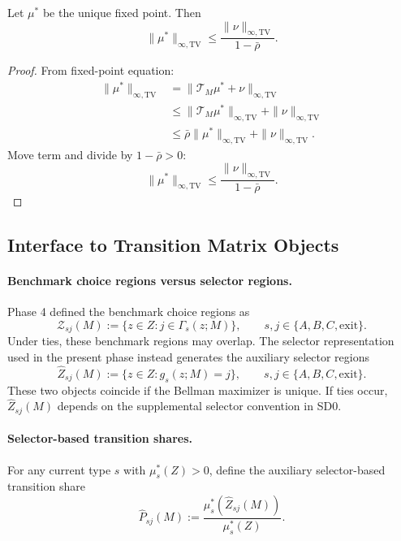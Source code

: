 \begin{proposition}
Let $\mu^*$ be the unique fixed point. Then
\begin{equation}
\|\mu^*\|_{\infty,\mathrm{TV}}
\le\frac{\|\nu\|_{\infty,\mathrm{TV}}}{1-\bar\rho}.
\label{eq:p7_mass_bound}
\end{equation}
\end{proposition}

\begin{proof}
From fixed-point equation:
\begin{align*}
\|\mu^*\|_{\infty,\mathrm{TV}}
&=\|\mathcal T_M\mu^*+\nu\|_{\infty,\mathrm{TV}}\\
&\le\|\mathcal T_M\mu^*\|_{\infty,\mathrm{TV}}+\|\nu\|_{\infty,\mathrm{TV}}\\
&\le\bar\rho\|\mu^*\|_{\infty,\mathrm{TV}}+\|\nu\|_{\infty,\mathrm{TV}}.
\end{align*}
Move term and divide by $1-\bar\rho>0$:
\[
\|\mu^*\|_{\infty,\mathrm{TV}}
\le\frac{\|\nu\|_{\infty,\mathrm{TV}}}{1-\bar\rho}.
\]
\end{proof}

\subsection{Interface to Transition Matrix Objects}

\paragraph{Benchmark choice regions versus selector regions.}
Phase 4 defined the benchmark choice regions as
\[
\mathcal Z_{sj}(M):=\{z\in Z:j\in\Gamma_s(z;M)\},
\qquad s,j\in\{A,B,C,\mathrm{exit}\}.
\]
Under ties, these benchmark regions may overlap. The selector representation used in the present phase instead generates the auxiliary selector regions
\[
\widehat Z_{sj}(M):=\{z\in Z:g_s(z;M)=j\},
\qquad s,j\in\{A,B,C,\mathrm{exit}\}.
\]
These two objects coincide if the Bellman maximizer is unique. If ties occur, $\widehat Z_{sj}(M)$ depends on the supplemental selector convention in SD0.

\paragraph{Selector-based transition shares.}
For any current type $s$ with $\mu_s^*(Z)>0$, define the auxiliary selector-based transition share
\begin{equation}
\widehat P_{sj}(M):=\frac{\mu_s^*(\widehat Z_{sj}(M))}{\mu_s^*(Z)}.
\label{eq:p7_Phat}
\end{equation}


